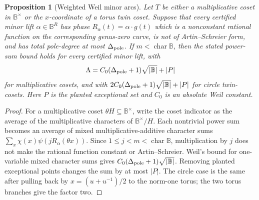\documentclass[12pt,a4paper]{amsart}
\numberwithin{equation}{section}
\newtheorem{proposition}[proposition]{Proposition}
\theoremstyle{remark}
\newcommand{\B}{\mathbb B}
\newcommand{\abs}[1]{\lvert #1\rvert}
\begin{document}
\begin{proposition}[Weighted Weil minor arcs]\label{prop:weighted-weil-minor-arcs}
Let \(T\) be either a multiplicative coset in \(\B^\times\) or the \(x\)-coordinate of a torus twin coset.  Suppose that every certified minor lift \(\alpha\in\B^R\) has phase \(R_\alpha(t)=\alpha\cdot g(t)\) which is a nonconstant rational function on the corresponding genus-zero curve, is not of Artin--Schreier form, and has total pole-degree at most \(\Delta_{\rm pole}\).  If \(m<\operatorname{char}\B\), then the stated power-sum bound holds for every certified minor lift, with
\[
        \Lambda=C_0(\Delta_{\rm pole}+1)\sqrt{\abs\B}+\abs P
\]
for multiplicative cosets, and with \(2C_0(\Delta_{\rm pole}+1)\sqrt{\abs\B}+\abs P\) for circle twin-cosets.  Here \(P\) is the planted exceptional set and \(C_0\) is an absolute Weil constant.
\end{proposition}

\begin{proof}
For a multiplicative coset \(\theta H\subseteq\B^\times\), write the coset indicator as the average of the multiplicative characters of \(\B^\times/H\).  Each nontrivial power sum becomes an average of mixed multiplicative-additive character sums \(\sum_x\chi(x)\psi(jR_\alpha(\theta x))\).  Since \(1\le j<m<\operatorname{char}\B\), multiplication by \(j\) does not make the rational function constant or Artin--Schreier.  Weil's bound for one-variable mixed character sums gives \(C_0(\Delta_{\rm pole}+1)\sqrt{\abs\B}\).  Removing planted exceptional points changes the sum by at most \(\abs P\).  The circle case is the same after pulling back by \(x=(u+u^{-1})/2\) to the norm-one torus; the two torus branches give the factor two.
\end{proof}
\end{document}
